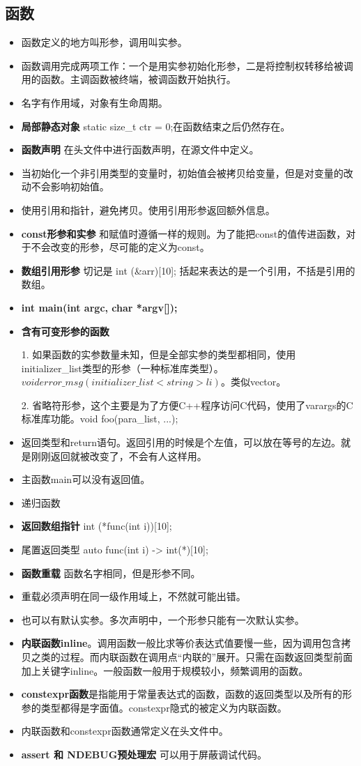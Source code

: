 \subsection{函数}
\begin{itemize}
	\item 函数定义的地方叫形参，调用叫实参。
	\item 函数调用完成两项工作：一个是用实参初始化形参，二是将控制权转移给被调用的函数。主调函数被终端，被调函数开始执行。
	\item 名字有作用域，对象有生命周期。
	\item \textbf{局部静态对象} static size\_t ctr = 0;在函数结束之后仍然存在。
	\item \textbf{函数声明} 在头文件中进行函数声明，在源文件中定义。
	\item 当初始化一个非引用类型的变量时，初始值会被拷贝给变量，但是对变量的改动不会影响初始值。
	\item 使用引用和指针，避免拷贝。使用引用形参返回额外信息。
	\item \textbf{const形参和实参} 和赋值时遵循一样的规则。为了能把const的值传进函数，对于不会改变的形参，尽可能的定义为const。
	\item \textbf{数组引用形参} 切记是 int (\&arr)[10]; 括起来表达的是一个引用，不括是引用的数组。
	\item \textbf{int main(int argc, char *argv[]);}
	\item \textbf{含有可变形参的函数} 
	
	1. 如果函数的实参数量未知，但是全部实参的类型都相同，使用initializer\_list类型的形参（一种标准库类型）。$void error\_msg(initializer\_list<string> li)$。类似vector。
	
	2. 省略符形参，这个主要是为了方便C++程序访问C代码，使用了varargs的C标准库功能。void foo(para\_list, ...);
	\item 返回类型和return语句。返回引用的时候是个左值，可以放在等号的左边。就是刚刚返回就被改变了，不会有人这样用。
	\item 主函数main可以没有返回值。
	\item 递归函数
	\item \textbf{返回数组指针} int (*func(int i))[10];
	\item 尾置返回类型 auto func(int i) -> int(*)[10];
	\item \textbf{函数重载} 函数名字相同，但是形参不同。
	\item 重载必须声明在同一级作用域上，不然就可能出错。
	\item 也可以有默认实参。多次声明中，一个形参只能有一次默认实参。
	\item \textbf{内联函数inline}。调用函数一般比求等价表达式值要慢一些，因为调用包含拷贝之类的过程。而内联函数在调用点“内联的”展开。只需在函数返回类型前面加上关键字inline。一般函数一般用于规模较小，频繁调用的函数。
	\item \textbf{constexpr函数}是指能用于常量表达式的函数，函数的返回类型以及所有的形参的类型都得是字面值。constexpr隐式的被定义为内联函数。
	\item 内联函数和constexpr函数通常定义在头文件中。
	\item \textbf{assert 和 NDEBUG预处理宏} 可以用于屏蔽调试代码。
	

\end{itemize}
